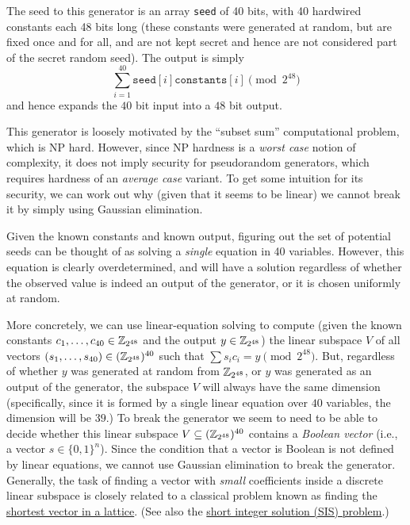 The seed to this generator is an array \texttt{seed} of 40 bits, with 40
hardwired constants each 48 bits long (these constants were generated at
random, but are fixed once and for all, and are not kept secret and
hence are not considered part of the secret random seed). The output is
simply
\begin{equation*}
\sum_{i=1}^{40} \texttt{seed}[i]\texttt{constants}[i] \pmod{2^{48}}
\end{equation*}
and hence expands the \(40\) bit input into a \(48\) bit output.

This generator is loosely motivated by the ``subset sum'' computational
problem, which is NP hard. However, since NP hardness is a \emph{worst
case} notion of complexity, it does not imply security for pseudorandom
generators, which requires hardness of an \emph{average case} variant.
To get some intuition for its security, we can work out why (given that
it seems to be linear) we cannot break it by simply using Gaussian
elimination.


Given the known constants and known output, figuring out the set of
potential seeds can be thought of as solving a \emph{single} equation in
40 variables. However, this equation is clearly overdetermined, and will
have a solution regardless of whether the observed value is indeed an
output of the generator, or it is chosen uniformly at random.

More concretely, we can use linear-equation solving to compute (given
the known constants \(c_1,\ldots,c_{40} \in {\mathbb{Z}}_{2^{48}}\) and the output
\(y \in {\mathbb{Z}}_{2^{48}}\)) the linear subspace \(V\) of all vectors
\((s_1,\ldots,s_{40}) \in ({\mathbb{Z}}_{2^{48}})^{40}\) such that
\(\sum s_i c_i = y \pmod{2^{48}}\). But, regardless of whether \(y\) was
generated at random from \({\mathbb{Z}}_{2^{48}}\), or \(y\) was generated as an
output of the generator, the subspace \(V\) will always have the same
dimension (specifically, since it is formed by a single linear equation
over \(40\) variables, the dimension will be \(39\).) To break the
generator we seem to need to be able to decide whether this linear
subspace \(V \subseteq ({\mathbb{Z}}_{2^{48}})^{40}\) contains a \emph{Boolean
vector} (i.e., a vector \(s\in \{0,1\}^n\)). Since the condition that a
vector is Boolean is not defined by linear equations, we cannot use
Gaussian elimination to break the generator. Generally, the task of
finding a vector with \emph{small} coefficients inside a discrete linear
subspace is closely related to a classical problem known as finding the
\href{https://goo.gl/WRNT9S}{shortest vector in a lattice}. (See also
the \href{https://goo.gl/KwZWhV}{short integer solution (SIS) problem}.)

